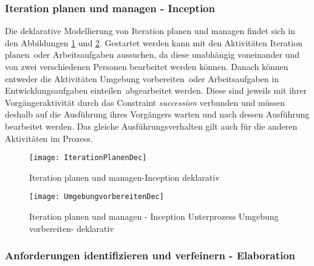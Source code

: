  \subsubsection{Iteration planen und managen - Inception}

Die deklarative Modellierung von Iteration planen und managen findet sich in den Abbildungen \ref{fig:IterationPlanenDec} und \ref{fig:UmgebungVorbereitenDec}. Gestartet werden kann mit den Aktivitäten \grqq Iteration planen\grqq \ oder \grqq Arbeitsaufgaben aussuchen\grqq, da diese unabhängig voneinander und von zwei verschiedenen Personen bearbeitet werden können.\newline
Danach können entweder die Aktivitäten \grqq Umgebung vorbereiten\grqq \ oder \grqq Arbeitsaufgaben in Entwicklungsaufgaben einteilen\grqq \ abgearbeitet werden. Diese sind jeweils mit ihrer Vorgängeraktivität durch das Constraint \textit{succession} verbunden und müssen deshalb auf die Ausführung ihres Vorgängers warten und nach dessen Ausführung bearbeitet werden.\newline
Das gleiche Ausführungsverhalten gilt auch für die anderen Aktivitäten im Prozess. 



\begin{figure}[htp]
\begin{center}
  \texttt{[image: IterationPlanenDec]} %
  \caption{Iteration planen und managen-Inception deklarativ}
  \label{fig:IterationPlanenDec}
\end{center}
\end{figure}

\begin{figure}[htp]
\begin{center}
  \texttt{[image: UmgebungvorbereitenDec]} %
  \caption{Iteration planen und managen - Inception Unterprozess Umgebung vorbereiten- deklarativ}
  \label{fig:UmgebungVorbereitenDec}
\end{center}
\end{figure}

 \subsubsection{Anforderungen identifizieren und verfeinern - Elaboration}

